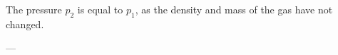 The pressure \( p_2 \) is equal to \( p_1 \), as the density and mass of the gas have not changed.

---